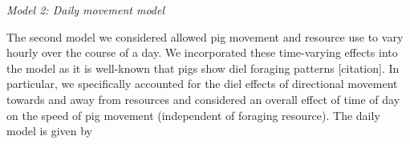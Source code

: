 \documentclass[a4paper]{article}
\begin{document}



\bigskip
\noindent
\emph{Model 2: Daily movement model}

The second model we considered allowed pig movement and resource use to vary hourly over the course of a day. We incorporated these time-varying effects into the model as it is well-known that pigs show diel foraging patterns [citation].  In particular, we specifically accounted for the diel effects of directional movement towards and away from resources and considered an overall effect of time of day on the speed of pig movement (independent of foraging resource). The daily model is given by
\end{document}
